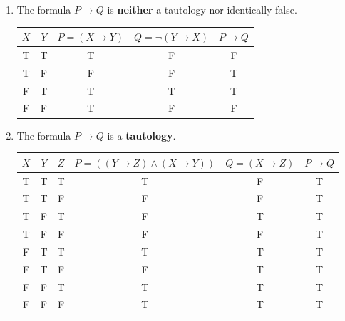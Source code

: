 \documentclass[12pt]{article}
\newcommand{\p}[1]{\item[\textnormal{(#1)}]}
\newenvironment{ps}
{\begin{enumerate}[leftmargin=0em, itemindent=1.5em]}
{\end{enumerate}}
\begin{document}
\begin{ps}
    \p{vii} The formula \(P \rightarrow Q\) is \textbf{neither} a tautology nor
    identically false.

        \begin{center}
        \begin{tabular}{|c|c|c|c|c|}
        \hline
        $X$ & $Y$ & $P = (X \rightarrow Y)$ & $Q = \neg (Y \rightarrow X)$ & $P \rightarrow Q$ \\
        \hline
        T & T & T & F & F \\
        T & F & F & F & T \\
        F & T & T & T & T \\
        F & F & T & F & F \\
        \hline
        \end{tabular}
        \end{center}

    \p{viii} The formula \(P \rightarrow Q\) is a \textbf{tautology}.

        \begin{center}
        \begin{tabular}{|c|c|c|c|c|c|}
        \hline
        $X$ & $Y$ & $Z$ & $P = ((Y \rightarrow Z) \wedge (X \rightarrow Y)) $ & $Q = (X \rightarrow
        Z)$ & $P \rightarrow Q$ \\
        \hline
        T & T & T & T & F & T \\
        T & T & F & F & F & T \\
        T & F & T & F & T & T \\
        T & F & F & F & F & T \\
        F & T & T & T & T & T \\
        F & T & F & F & T & T \\
        F & F & T & T & T & T \\
        F & F & F & T & T & T \\
        \hline
        \end{tabular}
        \end{center}

\end{ps}

\newpage
\end{document}
